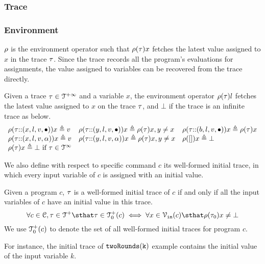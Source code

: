 \subsubsection{Trace}


\subsubsection{Environment} 
$\rho$ is the environment operator such that $\rho(\mathtt{\tau}) x$ fetches the latest value assigned to $x$ in the trace $\mathtt{\tau}$.
Since the trace records all the program's evaluations for assignments, 
the value assigned to variables can be recovered from the trace directly.
 \begin{defn}
 \label{def:adapt_env}
Given a trace $\mathtt{\tau} \in \mathcal{T}^{+\infty}$ and a variable $x$,
the environment operator $\rho(\mathtt{\tau}) l $ fetches the latest value assigned to $x$ on the trace $\mathtt{\tau}$,
and $\bot$ if the trace is an infinite trace as below.
\[
\begin{array}{lll}
\rho(\mathtt{\tau} {\small ::} (x, l, v, \bullet)) x \triangleq v
&
\rho(\mathtt{\tau} {\small ::} (y, l, v, \bullet)) x \triangleq \rho(\mathtt{\tau}) x, y \neq x
&
\rho(\mathtt{\tau} {\small ::} (b, l, v, \bullet)) x \triangleq \rho(\mathtt{\tau}) x
\\
\rho(\mathtt{\tau} {\small ::} (x, l, v, \alpha)) x \triangleq v
&
\rho(\mathtt{\tau} {\small ::} (y, l, v, \alpha)) x \triangleq \rho(\mathtt{\tau}) x, y \neq x
&
\rho({[]} ) x \triangleq \bot
\\
\rho(\mathtt{\tau} ) x \triangleq \bot ~ \text{if}~ \mathtt{\tau} \in \mathcal{T}^{\infty}
\end{array}
\]
\end{defn}
We also define with respect to specific command $c$ its well-formed initial trace, in which
every input variable of $c$ is assigned with an initial value.
\begin{defn}
 \label{def:adaptfun-initial_trace}
 Given a program $c$, $\mathtt{\tau}$ is a well-formed initial trace of $c$ if and only if all the input variables of $c$ have an initial value in this trace.
 \[
 \forall c \in \cdom, \trace \in \ftdom \sthat \trace \in \ftdom_0(c) \iff 
 \forall x \in \inpvar(c) \sthat \env(\trace_0) x \neq \bot
 \]
 We use $\mathcal{T}^{+}_0(c)$ to denote the set of all well-formed initial traces for program $c$.
 \end{defn}
 For instance, the initial trace of $\mathtt{twoRounds(k)}$ example contains the initial value of the input variable $k$.

